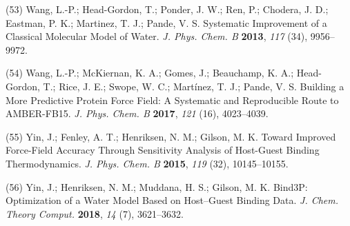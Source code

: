 \documentclass[11pt,notitlepage]{article}
\begin{document}
\leavevmode\hypertarget{ref-50lAQZra}{}%
(53) Wang, L.-P.; Head-Gordon, T.; Ponder, J. W.; Ren, P.; Chodera, J.
D.; Eastman, P. K.; Martinez, T. J.; Pande, V. S. Systematic Improvement
of a Classical Molecular Model of Water. \emph{J. Phys. Chem. B}
\textbf{2013}, \emph{117} (34), 9956--9972.

\leavevmode\hypertarget{ref-1E3wArY0j}{}%
(54) Wang, L.-P.; McKiernan, K. A.; Gomes, J.; Beauchamp, K. A.;
Head-Gordon, T.; Rice, J. E.; Swope, W. C.; Martínez, T. J.; Pande, V.
S. Building a More Predictive Protein Force Field: A Systematic and
Reproducible Route to AMBER-FB15. \emph{J. Phys. Chem. B} \textbf{2017},
\emph{121} (16), 4023--4039.

\leavevmode\hypertarget{ref-xRauI5mb}{}%
(55) Yin, J.; Fenley, A. T.; Henriksen, N. M.; Gilson, M. K. Toward
Improved Force-Field Accuracy Through Sensitivity Analysis of Host-Guest
Binding Thermodynamics. \emph{J. Phys. Chem. B} \textbf{2015},
\emph{119} (32), 10145--10155.

\leavevmode\hypertarget{ref-NeqIQDLp}{}%
(56) Yin, J.; Henriksen, N. M.; Muddana, H. S.; Gilson, M. K. Bind3P:
Optimization of a Water Model Based on Host--Guest Binding Data.
\emph{J. Chem. Theory Comput.} \textbf{2018}, \emph{14} (7), 3621--3632.
\end{document}
